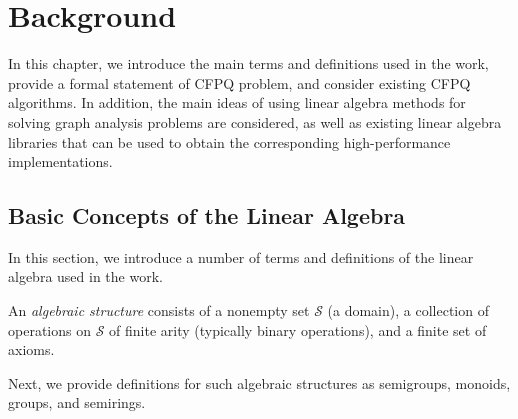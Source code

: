 \chapter{Background}\label{ch:ch1}
In this chapter, we introduce the main terms and definitions used in the work, provide a formal statement of CFPQ problem, and consider existing CFPQ algorithms. In addition, the main ideas of using linear algebra methods for solving graph analysis problems are considered, as well as existing linear algebra libraries that can be used to obtain the corresponding high-performance implementations.

\section{Basic Concepts of the Linear Algebra}\label{sec:ch1/sec1}
In this section, we introduce a number of terms and definitions of the linear algebra used in the work.

\begin{definition}
An \emph{algebraic structure} consists of a nonempty set $\mathcal{S}$ (a domain), a collection of operations on $\mathcal{S}$ of finite arity (typically binary operations), and a finite set of axioms.
\end{definition}

Next, we provide definitions for such algebraic structures as semigroups, monoids, groups, and semirings.

